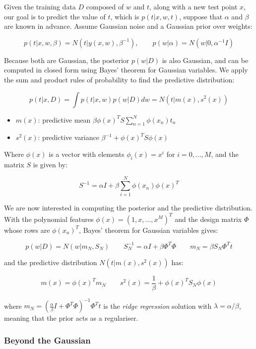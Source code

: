 \documentclass{article}
\begin{document}
Given the training data \(D\) composed of \(w\) and \(t\), along with a
new test point \(x\), our goal is to predict the value of \(t\), which
is \(p(t | x, w, t)\), suppose that \(\alpha\) and \(\beta\) are known
in advance. Assume Gaussian noise and a Gaussian prior over weights:

\[p(t | x, w, \beta) = N(t | y(x, w), \beta^{-1}),\qquad p(w|\alpha ) = N(w | 0,
\alpha^{-1} I)\]

Because both are Gaussian, the posterior \(p(w | D)\) is also Gaussian,
and can be computed in closed form using Bayes' theorem for Gaussian
variables. We apply the sum and product rules of probability to find the
predictive distribution:

\[p(t | x, D) = \int p(t | x, w) p(w | D) dw = N(t | m(x), s^2(x))\]

\begin{itemize}
\item
  \(m(x)\): predictive mean
  \(\beta \phi(x)^T S \sum_{n=1}^N \phi(x_n)t_n\)
\item
  \(s^2(x)\): predictive variance \(\beta^{-1} + \phi(x)^T S \phi(x)\)
\end{itemize}

Where \(\phi(x)\) is a vector with elements \(\phi_i(x) = x^i\) for
\(i = 0, ..., M\), and the matrix \(S\) is given by:

\[S^{-1} = \alpha I + \beta \sum_{i=1}^N \phi(x_n)\phi(x)^T\]

We are now interested in computing the posterior and the predictive
distribution. With the polynomial features
\(\phi (x) = (1, x, ..., x^M)^T\) and the design matrix \(\Phi\) whose
rows are \(\phi (x_n)^T\), Bayes' theorem for Gaussian variables gives:

\[p(w | D) = N(w | m_N, S_N) \qquad S_N^{-1} = \alpha I + \beta \Phi^T \Phi
\qquad m_N = \beta S_N \Phi^T t\]

and the predictive distribution \(N(t | m(x), s^2(x))\) has:

\[m(x) = \phi(x)^T m_N \qquad s^2(x) = \frac{1}{\beta} + \phi (x)^T S_N \phi
(x)\]

where \(m_N = (\frac{\alpha}{\beta} I + \Phi^T \Phi)^{-1} \Phi^T t\) is
the \emph{ridge regression} solution with \(\lambda = \alpha / \beta\),
meaning that the prior acts as a regulariser.

\subsubsection{Beyond the Gaussian}\label{beyond-the-gaussian}
\end{document}
